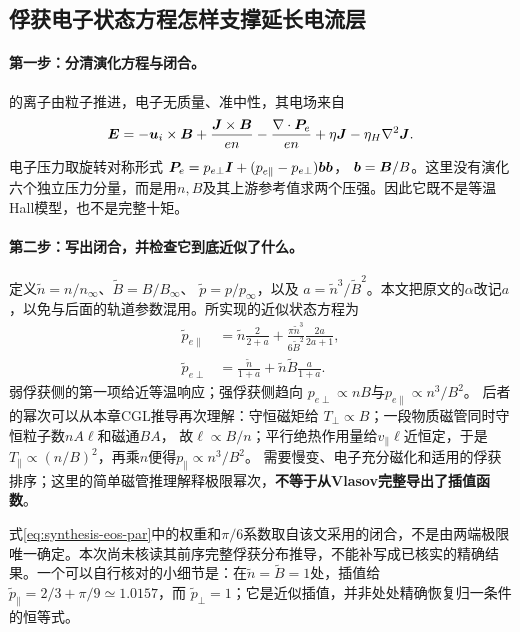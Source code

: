 \documentclass[UTF8,a4paper,11pt,openany,fontset=fandol]{ctexbook}
\begin{document}
\subsection{俘获电子状态方程怎样支撑延长电流层}\label{sec:synthesis-closure-model}
\paragraph{第一步：分清演化方程与闭合。}
\citet{F611}的离子由粒子推进，电子无质量、准中性，其电场来自
\begin{equation}
\bm{E}=-\bm{u}_i\times\bm{B}+\frac{\bm{J}\times\bm{B}}{en}
-\frac{\nabla\cdot\bm{P}_e}{en}
+\eta\bm{J}-\eta_H\nabla^2\bm{J} .
\end{equation}
电子压力取旋转对称形式
$\bm{P}_e=p_{e\perp}\bm{I}+(p_{e\parallel}-p_{e\perp})\bm{b}\bm{b}$，
$\bm{b}=\bm{B}/B$。这里没有演化六个独立压力分量，而是用$n,B$及其上游参考值求两个压强。因此它既不是等温Hall模型，也不是完整十矩。

\paragraph{第二步：写出闭合，并检查它到底近似了什么。}
定义$\widetilde n=n/n_\infty$、$\widetilde B=B/B_\infty$、
$\widetilde p=p/p_\infty$，以及
$a=\widetilde n^3/\widetilde B^2$。本文把原文的$\alpha$改记$a$，以免与后面的轨道参数混用。所实现的近似状态方程为
\begin{align}
\widetilde p_{e\parallel}
 &=\widetilde n\frac{2}{2+a}
   +\frac{\pi\widetilde n^3}{6\widetilde B^2}
      \frac{2a}{2a+1},\label{eq:synthesis-eos-par}\\
\widetilde p_{e\perp}
 &=\frac{\widetilde n}{1+a}
   +\widetilde n\widetilde B\frac{a}{1+a}.
\end{align}
弱俘获侧的第一项给近等温响应；强俘获侧趋向
$p_{e\perp}\propto nB$与$p_{e\parallel}\propto n^3/B^2$。
后者的幂次可以从本章CGL推导再次理解：守恒磁矩给
$T_\perp\propto B$；一段物质磁管同时守恒粒子数$nA\ell$和磁通$BA$，
故$\ell\propto B/n$；平行绝热作用量给$v_\parallel\ell$近恒定，于是
$T_\parallel\propto(n/B)^2$，再乘$n$便得$p_\parallel\propto n^3/B^2$。
需要慢变、电子充分磁化和适用的俘获排序；这里的简单磁管推理解释极限幂次，\textbf{不等于从Vlasov完整导出了插值函数}。

式\eqref{eq:synthesis-eos-par}中的权重和$\pi/6$系数取自该文采用的闭合，不是由两端极限唯一确定。本次尚未核读其前序完整俘获分布推导，不能补写成已核实的精确结果。一个可以自行核对的小细节是：在$\widetilde n=\widetilde B=1$处，插值给
$\widetilde p_\parallel=2/3+\pi/9\simeq1.0157$，而
$\widetilde p_\perp=1$；它是近似插值，并非处处精确恢复归一条件的恒等式。
\end{document}
